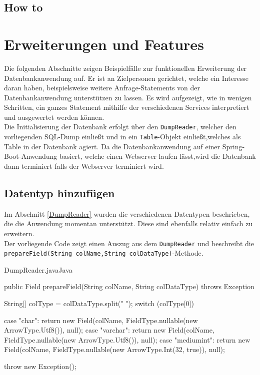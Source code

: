 \subsection{How to}



\section{Erweiterungen und Features}
\label{erweitern}

Die folgenden Abschnitte zeigen Beispielfälle zur funktionellen Erweiterung der Datenbankanwendung auf. Er ist an Zielpersonen gerichtet, welche ein Interesse daran haben, beispielsweise weitere Anfrage-Statements von der Datenbankanwendung unterstützen zu lassen. Es wird aufgezeigt, wie in wenigen Schritten, ein ganzes Statement mithilfe der verschiedenen Services interpretiert und ausgewertet werden können.\\
Die Initialisierung der Datenbank erfolgt über den \texttt{DumpReader}, welcher den vorliegenden SQL-Dump einließt und in ein \texttt{Table}-Objekt einließt,welches als Table in der Datenbank agiert.
Da die Datenbankanwendung auf einer Spring-Boot-Anwendung basiert, welche einen Webserver laufen lässt,wird die Datenbank dann terminiert falls der Webserver terminiert wird. 

\subsection{Datentyp hinzufügen}
Im Abschnitt \ref{DumpReader} wurden die verschiedenen Datentypen beschrieben, die die Anwendung momentan unterstützt. Diese sind ebenfalls relativ einfach zu erweitern.\\
Der vorliegende Code zeigt einen Auszug aus dem \texttt{DumpReader} und beschreibt die \texttt{prepareField(String colName,String colDataType)}-Methode.

\begin{codeblock}{DumpReader.java}{Java}
  \begin{javacode}
public Field prepareField(String colName, String colDataType) throws Exception {
        String[] colType = colDataType.split(" ");
        switch (colType[0]) {
            case "char":
                return new Field(colName, FieldType.nullable(new ArrowType.Utf8()), null);
            case "varchar":
                return new Field(colName, FieldType.nullable(new ArrowType.Utf8()), null);
            case "mediumint":
                return new Field(colName, FieldType.nullable(new ArrowType.Int(32, true)), null);

        }
        throw new Exception();
    }
  \end{javacode}
\end{codeblock}

